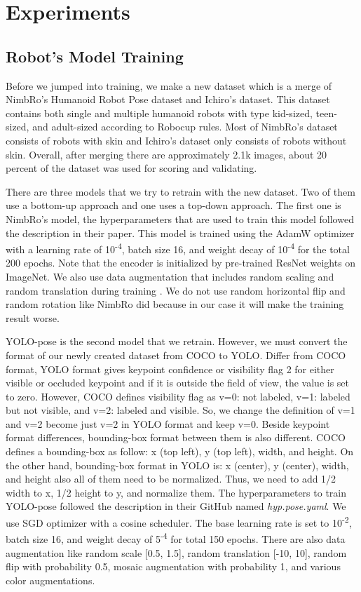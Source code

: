 \section{Experiments}
\label{sec:experiments}


\subsection{Robot's Model Training}
\label{subsec:robotmodeltraining}

Before we jumped into training, we make a new dataset which is a merge of NimbRo's Humanoid Robot Pose dataset and Ichiro's dataset.
This dataset contains both single and multiple humanoid robots with type kid-sized, teen-sized, and adult-sized according to Robocup rules.
Most of NimbRo's dataset consists of robots with skin and Ichiro's dataset only consists of robots without skin.
Overall, after merging there are approximately 2.1k images, about 20 percent of the dataset was used for scoring and validating.

There are three models that we try to retrain with the new dataset. Two of them use a bottom-up approach and one uses a top-down approach.
The first one is NimbRo's model, the hyperparameters that are used to train this model followed the description in their paper.
This model is trained using the AdamW optimizer with a learning rate of 10\textsuperscript{-4},
batch size 16, and weight decay of 10\textsuperscript{-4} for the total 200 epochs.
Note that the encoder is initialized by pre-trained ResNet weights on ImageNet.
We also use data augmentation that includes random scaling and random translation during training \citep{amini2021}.
We do not use random horizontal flip and random rotation like NimbRo did because in our case it will make the training result worse.

YOLO-pose is the second model that we retrain.  However, we must convert the format of our newly created dataset from COCO to YOLO.
Differ from COCO format, YOLO format gives keypoint confidence or visibility flag 2 for either visible or occluded keypoint
and if it is outside the field of view, the value is set to zero. However, COCO defines visibility flag as v=0: not labeled, v=1: labeled but not visible, and v=2: labeled and visible. So, we change the definition of
v=1 and v=2 become just v=2 in YOLO format and keep v=0.
Beside keypoint format differences, bounding-box format between them is also different. COCO defines a bounding-box as follow: x (top left), y (top left), width, and height. On the other hand,
bounding-box format in YOLO is: x (center), y (center), width, and height also all of them need to be normalized. Thus, we need to add 1/2 width to x, 1/2 height to y, and normalize them.
The hyperparameters to train YOLO-pose followed the description in their GitHub named \emph{hyp.pose.yaml}.
We use SGD optimizer with a cosine scheduler. The base learning rate is set to 10\textsuperscript{-2}, batch size 16,
and weight decay of 5\textsuperscript{-4} for total 150 epochs. There are also data augmentation like random scale [0.5, 1.5],
random translation [-10, 10], random flip with probability 0.5, mosaic augmentation with probability 1, and various color augmentations.

